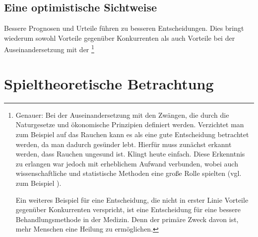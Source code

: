 


% 
% 




\subsection{Eine optimistische Sichtweise}



% 

Bessere Prognosen und Urteile führen zu besseren Entscheidungen. Dies bringt
wiederum sowohl Vorteile gegenüber Konkurrenten als auch Vorteile bei der
Auseinandersetzung mit der \grqq\footnote{
Genauer: Bei der Auseinandersetzung mit den Zwängen, die durch die Naturgesetze
und ökonomische Prinzipien definiert werden. Verzichtet man zum Beispiel auf das 
Rauchen kann es als eine gute Entscheidung betrachtet werden, da man dadurch
gesünder lebt. Hierfür muss zunächst erkannt werden, dass Rauchen ungesund ist.
Klingt heute einfach. Diese Erkenntnis zu erlangen war jedoch mit erheblichem
Aufwand verbunden, wobei auch wissenschaftliche und statistische Methoden
eine große Rolle spielten (vgl. zum Beispiel \cite{Proctor}).

Ein weiteres Beispiel für eine Entscheidung, die nicht in erster Linie Vorteile
gegenüber Konkurrenten verspricht, ist eine Entscheidung für eine bessere
Behandlungsmethode in der Medizin. Denn der primäre Zweck davon ist, 
mehr Menschen eine Heilung zu ermöglichen.
}

\section{Spieltheoretische Betrachtung}

